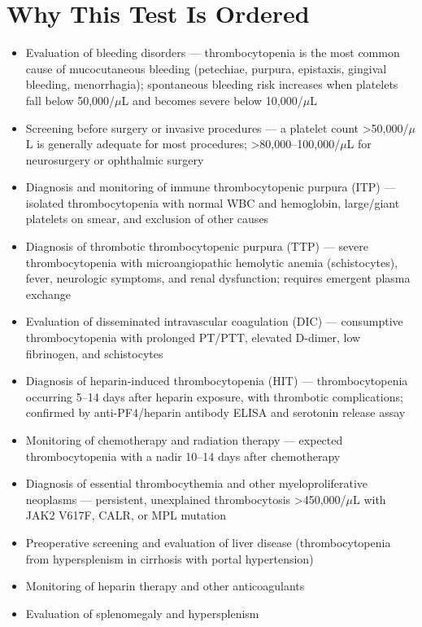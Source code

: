 \section*{Why This Test Is Ordered}
\begin{itemize}
  \item Evaluation of bleeding disorders --- thrombocytopenia is the most common cause of mucocutaneous bleeding (petechiae, purpura, epistaxis, gingival bleeding, menorrhagia); spontaneous bleeding risk increases when platelets fall below 50,000/$\mu$L and becomes severe below 10,000/$\mu$L
  \item Screening before surgery or invasive procedures --- a platelet count >50,000/$\mu$L is generally adequate for most procedures; >80,000--100,000/$\mu$L for neurosurgery or ophthalmic surgery
  \item Diagnosis and monitoring of immune thrombocytopenic purpura (ITP) --- isolated thrombocytopenia with normal WBC and hemoglobin, large/giant platelets on smear, and exclusion of other causes
  \item Diagnosis of thrombotic thrombocytopenic purpura (TTP) --- severe thrombocytopenia with microangiopathic hemolytic anemia (schistocytes), fever, neurologic symptoms, and renal dysfunction; requires emergent plasma exchange
  \item Evaluation of disseminated intravascular coagulation (DIC) --- consumptive thrombocytopenia with prolonged PT/PTT, elevated D-dimer, low fibrinogen, and schistocytes
  \item Diagnosis of heparin-induced thrombocytopenia (HIT) --- thrombocytopenia occurring 5--14 days after heparin exposure, with thrombotic complications; confirmed by anti-PF4/heparin antibody ELISA and serotonin release assay
  \item Monitoring of chemotherapy and radiation therapy --- expected thrombocytopenia with a nadir 10--14 days after chemotherapy
  \item Diagnosis of essential thrombocythemia and other myeloproliferative neoplasms --- persistent, unexplained thrombocytosis >450,000/$\mu$L with JAK2 V617F, CALR, or MPL mutation
  \item Preoperative screening and evaluation of liver disease (thrombocytopenia from hypersplenism in cirrhosis with portal hypertension)
  \item Monitoring of heparin therapy and other anticoagulants
  \item Evaluation of splenomegaly and hypersplenism
\end{itemize}

